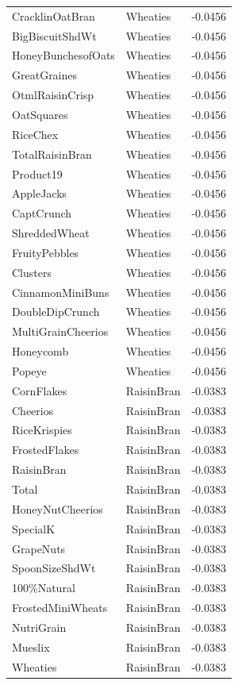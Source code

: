 \begin{table}[!htbp]
\begin{tabular}{lll}
CracklinOatBran & Wheaties & -0.0456
\\
BigBiscuitShdWt & Wheaties & -0.0456
\\
HoneyBunchesofOats & Wheaties & -0.0456
\\
GreatGraines & Wheaties & -0.0456
\\
OtmlRaisinCrisp & Wheaties & -0.0456
\\
OatSquares & Wheaties & -0.0456
\\
RiceChex & Wheaties & -0.0456
\\
TotalRaisinBran & Wheaties & -0.0456
\\
Product19 & Wheaties & -0.0456
\\
AppleJacks & Wheaties & -0.0456
\\
CaptCrunch & Wheaties & -0.0456
\\
ShreddedWheat & Wheaties & -0.0456
\\
FruityPebbles & Wheaties & -0.0456
\\
Clusters & Wheaties & -0.0456
\\
CinnamonMiniBuns & Wheaties & -0.0456
\\
DoubleDipCrunch & Wheaties & -0.0456
\\
MultiGrainCheerios & Wheaties & -0.0456
\\
Honeycomb & Wheaties & -0.0456
\\
Popeye & Wheaties & -0.0456
\\
CornFlakes & RaisinBran & -0.0383
\\
Cheerios & RaisinBran & -0.0383
\\
RiceKrispies & RaisinBran & -0.0383
\\
FrostedFlakes & RaisinBran & -0.0383
\\
RaisinBran & RaisinBran & -0.0383
\\
Total & RaisinBran & -0.0383
\\
HoneyNutCheerios & RaisinBran & -0.0383
\\
SpecialK & RaisinBran & -0.0383
\\
GrapeNuts & RaisinBran & -0.0383
\\
SpoonSizeShdWt & RaisinBran & -0.0383
\\
100\%Natural & RaisinBran & -0.0383
\\
FrostedMiniWheats & RaisinBran & -0.0383
\\
NutriGrain & RaisinBran & -0.0383
\\
Mueslix & RaisinBran & -0.0383
\\
Wheaties & RaisinBran & -0.0383
\\

\end{tabular}
\end{table}
